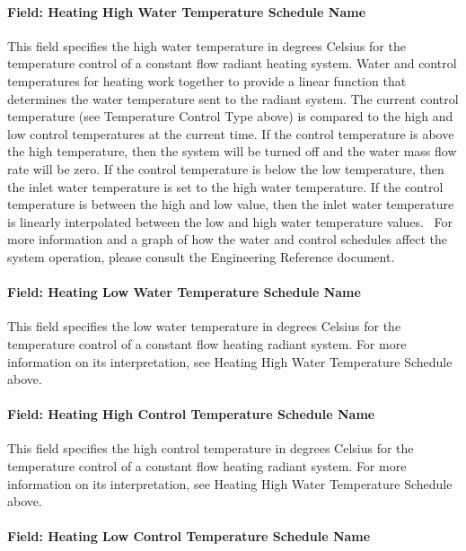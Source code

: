 \paragraph{Field: Heating High Water Temperature Schedule Name}\label{field-heating-high-water-temperature-schedule-name}

This field specifies the high water temperature in degrees Celsius for the temperature control of a constant flow radiant heating system. Water and control temperatures for heating work together to provide a linear function that determines the water temperature sent to the radiant system. The current control temperature (see Temperature Control Type above) is compared to the high and low control temperatures at the current time. If the control temperature is above the high temperature, then the system will be turned off and the water mass flow rate will be zero. If the control temperature is below the low temperature, then the inlet water temperature is set to the high water temperature. If the control temperature is between the high and low value, then the inlet water temperature is linearly interpolated between the low and high water temperature values.~ For more information and a graph of how the water and control schedules affect the system operation, please consult the Engineering Reference document.

\paragraph{Field: Heating Low Water Temperature Schedule Name}\label{field-heating-low-water-temperature-schedule-name}

This field specifies the low water temperature in degrees Celsius for the temperature control of a constant flow heating radiant system. For more information on its interpretation, see Heating High Water Temperature Schedule above.

\paragraph{Field: Heating High Control Temperature Schedule Name}\label{field-heating-high-control-temperature-schedule-name}

This field specifies the high control temperature in degrees Celsius for the temperature control of a constant flow heating radiant system. For more information on its interpretation, see Heating High Water Temperature Schedule above.

\paragraph{Field: Heating Low Control Temperature Schedule Name}\label{field-heating-low-control-temperature-schedule-name}

